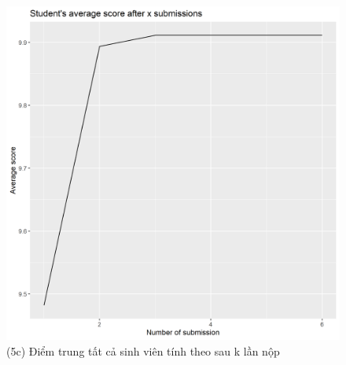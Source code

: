 \documentclass[a4paper]{article}
\theoremstyle{definition}
\begin{document}
\begin{figure}[!ht]
    \centering
    \includegraphics[scale=0.4]{Pics/q5c_file2.png}
    \caption{(5c) Điểm trung tất cả sinh viên tính theo sau k lần nộp}
    \label{fig:my_label}
\end{figure}

\newpage
\end{document}
